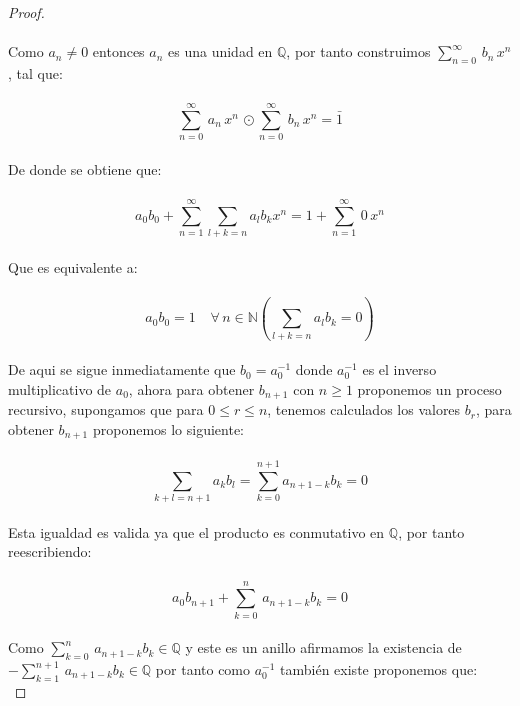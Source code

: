 \documentclass[11pt,letterpaper]{article}
\newcommand{\N}{\mathbb{N}}
\newcommand{\Q}{\mathbb{Q}}
\begin{document}
\begin{proof}\,\\
    \,\\
    Como $a_n\neq 0$ entonces $a_n$ es una unidad en $\Q$, por tanto construimos $\sum_{n=0}^{\infty}\,b_n\,x^n$, tal que:\,\\
    \,\\
    \begin{equation*}
        \sum_{n=0}^{\infty}\,a_n\,x^n\,\odot \sum_{n=0}^{\infty}\,b_n\,x^n=\bar{1}
    \end{equation*}\,\\
    De donde se obtiene que:\,\\
    \,\\
    \begin{equation*}
        a_0b_0+\sum_{n=1}^{\infty}\sum_{l+k=n}a_lb_k x^n=1+\sum_{n=1}^{\infty}\,0\,x^n
    \end{equation*}\,\\ 
    Que es equivalente a:\,\\
    \,\\
    \begin{equation*}
        a_0b_0=1\,\:\:\:\: \forall\,n\in \N \left(\sum_{l+k=n}a_lb_k=0\right)
    \end{equation*}\,\\
    De aqui se sigue inmediatamente que $b_0=a_0^{-1}$ donde $a_0^{-1}$ es el inverso multiplicativo de $a_0$, ahora para obtener 
    $b_{n+1}$ con $n\geq 1$ proponemos un proceso recursivo, supongamos que para $0\leq r\leq n$, tenemos calculados los valores $b_r$, para obtener $b_{n+1}$
    proponemos lo siguiente:\,\\
    \,\\
    \begin{equation*}
        \sum_{k+l=n+1}a_kb_l=\sum_{k=0}^{n+1}a_{n+1-k}b_k=0
    \end{equation*}\,\\
    Esta igualdad es valida ya que el producto es conmutativo en $\Q$, por tanto reescribiendo:\,\\
    \,\\
    \begin{equation*}
        a_0b_{n+1}+\sum_{k=0}^{n}\,a_{n+1-k}b_k=0
    \end{equation*}\,\\
    Como $\displaystyle\sum_{k=0}^{n}\,a_{n+1-k}b_k\in \Q$ y este es un anillo afirmamos la existencia de $\displaystyle-\sum_{k=1}^{n+1}\,a_{n+1-k}b_k\in \Q$
    por tanto como $a_0^{-1}$ tambi\'en existe proponemos que:\,\\

\end{proof}
\end{document}

